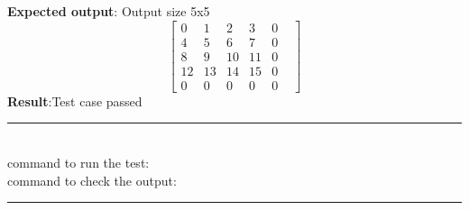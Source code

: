 \documentclass[fleqn, 12.5pt,a4paper]{report}
\begin{document}
\textbf{Expected output}: Output size 5x5 
$$
 \begin{bmatrix}
0 & 1 & 2 & 3 & 0 \\
4 & 5 & 6 & 7 & 0 \\
8 & 9 & 10 & 11 & 0 \\
12 & 13 & 14 & 15 & 0 \\
0 & 0& 0& 0& 0&
\end{bmatrix}
$$
\textbf{Result}:Test case passed
\\
{\rule{\linewidth}{0.02cm}}\\
command to run the test: {\selectfont {}}\\
command to check the output: {\selectfont {}}\\
{\rule{\linewidth}{0.02cm}}
\end{document}
